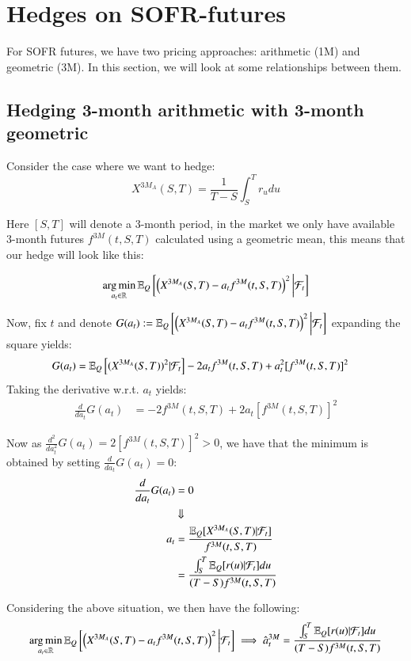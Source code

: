 \newpage 

\section{Hedges on SOFR-futures}
For SOFR futures, we have two pricing approaches: arithmetic (1M) and geometric (3M). In this section, we will look at some relationships between them.


\subsection{Hedging 3-month arithmetic with 3-month geometric}
Consider the case where we want to hedge: 
$$
X^{3M_{A}}(S,T) = \frac{1}{T-S}\int_{S}^{T}r_{u}du
$$

Here $[S,T]$ will denote a 3-month period, in the market we only have available
3-month futures $f^{3M}(t,S,T)$  calculated using a geometric mean, this means that our hedge will look like this:

\begin{align*}
\operatorname*{arg\,min}\limits_{a_{t} \in \mathbb{R}}\mathbb{E}_{Q}\left[
\left(
X^{3M_{A}}(S,T)-a_{t}f^{3M}(t,S,T)
\right)^{2}
\bigg{|}\mathcal{F}_{t}
\right]
\end{align*}

Now, fix $t$ and denote
 $G(a_{t}) :=\mathbb{E}_{Q}\left[
\left(X^{3M_{A}}(S,T)-a_{t}f^{3M}(t,S,T)
\right)^{2}
\bigg{|}\mathcal{F}_{t}
\right]
$ 
expanding the square yields:
\begin{align*}
G(a_{t}) &= \mathbb{E}_{Q}\left[(X^{3M_{A}}(S,T))^{2}|\mathcal{F}_{t}\right] -2a_{t}f^{3M}(t,S,T) +
a_{t}^{2}[f^{3M}(t,S,T)]^{2}
\end{align*}
Taking the derivative w.r.t. $a_{t}$ yields: 
\begin{align*}
\frac{d}{da_{t}}G(a_{t}) &= -2f^{3M}(t,S,T) + 2a_{t}[f^{3M}(t,S,T)]^{2}  
\end{align*} 

Now as $\frac{d^{2}}{da_{t}^{2}}G(a_{t}) = 2[f^{3M}(t,S,T)]^{2} > 0$, we have that the minimum is obtained by setting $\frac{d}{da_{t}}G(a_{t}) = 0$:
\begin{align*}
\frac{d}{da_{t}}G(a_{t}) &= 0 \\ 
&\Downarrow \\ 
a_{t} &= \frac{
\mathbb{E}_{Q}[X^{3M_{A}}(S,T)|\mathcal{F}_{t}]
}{
f^{3M}(t,S,T)
} \\ 
&= \frac{
\int_{S}^{T}\mathbb{E}_{Q}[r(u)|\mathcal{F}_{t}]du
}{
(T-S)f^{3M}(t,S,T)
}
\end{align*}

\begin{result}
\label{result: optimal_SOFR_hedge_3MA_vs_3GM}
Considering the above situation, we then have the following:
\begin{align*}
\operatorname*{arg\,min}\limits_{a_{t} \in \mathbb{R}}\mathbb{E}_{Q}\left[
\left(
X^{3M_{A}}(S,T)-a_{t}f^{3M}(t,S,T)
\right)^{2}
\bigg{|}\mathcal{F}_{t}
\right] 
\implies
\hat{a}_{t}^{3M} = \frac{
\int_{S}^{T}\mathbb{E}_{Q}[r(u)|\mathcal{F}_{t}]du
}{
(T-S)f^{3M}(t,S,T)
}
\end{align*}
\end{result} 

